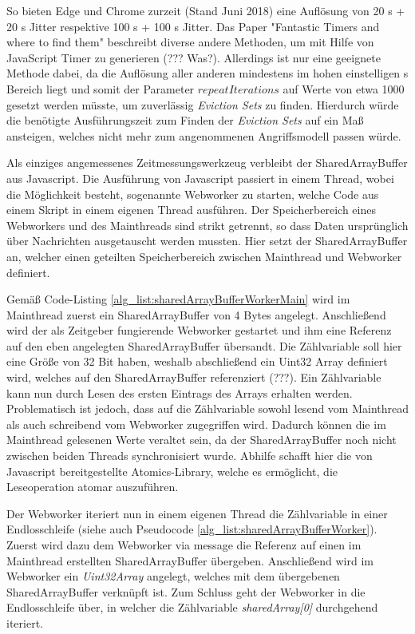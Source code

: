 So bieten Edge und Chrome zurzeit (Stand Juni 2018) eine Auflösung von 20 \textmu s + 20 \textmu s Jitter respektive 100 \textmu s + 100 \textmu s Jitter.
Das Paper "Fantastic Timers and where to find them" \cite{FantasticTimers} beschreibt diverse andere Methoden, um mit Hilfe von JavaScript Timer zu generieren (??? Was?). 
Allerdings ist nur eine geeignete Methode dabei, da die Auflösung aller anderen mindestens im hohen einstelligen \textmu s Bereich liegt und somit der Parameter $repeatIterations$ auf Werte von etwa 1000 gesetzt werden müsste, um zuverlässig \textit{Eviction Sets} zu finden. 
Hierdurch würde die benötigte Ausführungszeit zum Finden der \textit{Eviction Sets} auf ein Maß ansteigen, welches nicht mehr zum angenommenen Angriffsmodell passen würde.

\newtext

Als einziges angemessenes Zeitmessungswerkzeug verbleibt der SharedArrayBuffer aus Javascript. 
Die Ausführung von Javascript passiert in einem Thread, wobei die Möglichkeit besteht, sogenannte Webworker zu starten, welche Code aus einem Skript in einem eigenen Thread ausführen.
Der Speicherbereich eines Webworkers und des Mainthreads sind strikt getrennt, so dass Daten ursprünglich über Nachrichten ausgetauscht werden mussten. Hier setzt der SharedArrayBuffer an, welcher einen geteilten Speicherbereich zwischen Mainthread und Webworker definiert.

Gemäß Code-Listing \ref{alg_list:sharedArrayBufferWorkerMain} wird im Mainthread zuerst ein SharedArrayBuffer von 4 Bytes angelegt. Anschließend wird der als Zeitgeber fungierende Webworker gestartet und ihm eine Referenz auf den eben angelegten SharedArrayBuffer übersandt. 
Die Zählvariable soll hier eine Größe von 32 Bit haben, weshalb abschließend ein Uint32 Array definiert wird, welches auf den SharedArrayBuffer referenziert (???). 
Ein Zählvariable kann nun durch Lesen des ersten Eintrags des Arrays erhalten werden. 
Problematisch ist jedoch, dass auf die Zählvariable sowohl lesend vom Mainthread als auch schreibend vom Webworker zugegriffen wird. 
Dadurch können die im Mainthread gelesenen Werte veraltet sein, da der SharedArrayBuffer noch nicht zwischen beiden Threads synchronisiert wurde. 
Abhilfe schafft hier die von Javascript bereitgestellte Atomics-Library, welche es ermöglicht, die Leseoperation atomar auszuführen.

Der Webworker iteriert nun in einem eigenen Thread die Zählvariable in einer Endlosschleife (siehe auch Pseudocode \ref{alg_list:sharedArrayBufferWorker}). 
Zuerst wird dazu dem Webworker via message die Referenz auf einen im Mainthread erstellten SharedArrayBuffer übergeben.
Anschließend wird im Webworker ein \textit{Uint32Array} angelegt, welches mit dem übergebenen SharedArrayBuffer verknüpft ist. 
Zum Schluss geht der Webworker in die Endlosschleife über, in welcher die Zählvariable \textit{sharedArray[0]} durchgehend iteriert.

